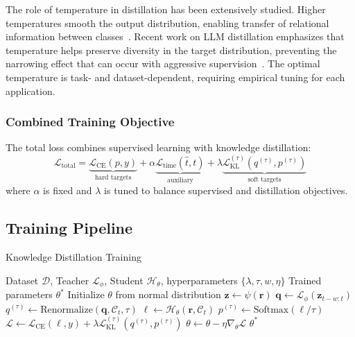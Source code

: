 The role of temperature in distillation has been extensively studied. Higher temperatures smooth the output distribution, enabling transfer of relational information between classes~\cite{hintonDistillingKnowledgeNeural2015}. Recent work on LLM distillation emphasizes that temperature helps preserve diversity in the target distribution, preventing the narrowing effect that can occur with aggressive supervision~\cite{singhORPODistillMixedPolicyPreference2025}. The optimal temperature is task- and dataset-dependent, requiring empirical tuning for each application.

\subsubsection{Combined Training Objective}

The total loss combines supervised learning with knowledge distillation:
\begin{equation}
    \mathcal{L}_{\text{total}} = \underbrace{\mathcal{L}_{\text{CE}}(p, y)}_{\text{hard targets}} +
    \alpha \underbrace{\mathcal{L}_{\text{time}}(\hat{t}, t)}_{\text{auxiliary}} +
    \lambda \underbrace{\mathcal{L}_{\text{KL}}^{(\tau)}(q^{(\tau)}, p^{(\tau)})}_{\text{soft targets}}
    \label{eq:total-loss}
\end{equation}
where $\alpha$ is fixed and $\lambda$ is tuned to balance supervised and distillation objectives.

\subsection{Training Pipeline}
\label{sec:method-training}

\begin{algorithm}[t]
    \caption{Knowledge Distillation Training}
    \label{alg:distillation}
    \begin{algorithmic}[1]
        \Require Dataset $\mathcal{D}$, Teacher $\mathcal{L}_\phi$, Student $\mathcal{H}_\theta$, hyperparameters $\{\lambda, \tau, w, \eta\}$
        \Ensure Trained parameters $\theta^*$
        \State Initialize $\theta$ from normal distribution
        \State $\mathbf{z} \gets \psi(\mathbf{r})$ 
        \State $\mathbf{q} \gets \mathcal{L}_\phi(\mathbf{z}_{t-w:t})$ 
        \State $q^{(\tau)} \gets \text{Renormalize}(\mathbf{q}, \mathcal{C}_t, \tau)$ 
        \State $\boldsymbol{\ell} \gets \mathcal{H}_\theta(\mathbf{r}, \mathcal{C}_t)$ 
        \State $p^{(\tau)} \gets \text{Softmax}(\boldsymbol{\ell} / \tau)$
        \State $\mathcal{L} \gets \mathcal{L}_{\text{CE}}(\boldsymbol{\ell}, y) + \lambda \mathcal{L}_{\text{KL}}^{(\tau)}(q^{(\tau)}, p^{(\tau)})$
        \State $\theta \gets \theta - \eta \nabla_\theta \mathcal{L}$
        \EndFor
        \EndFor
        \State \Return $\theta^*$
    \end{algorithmic}
\end{algorithm}

